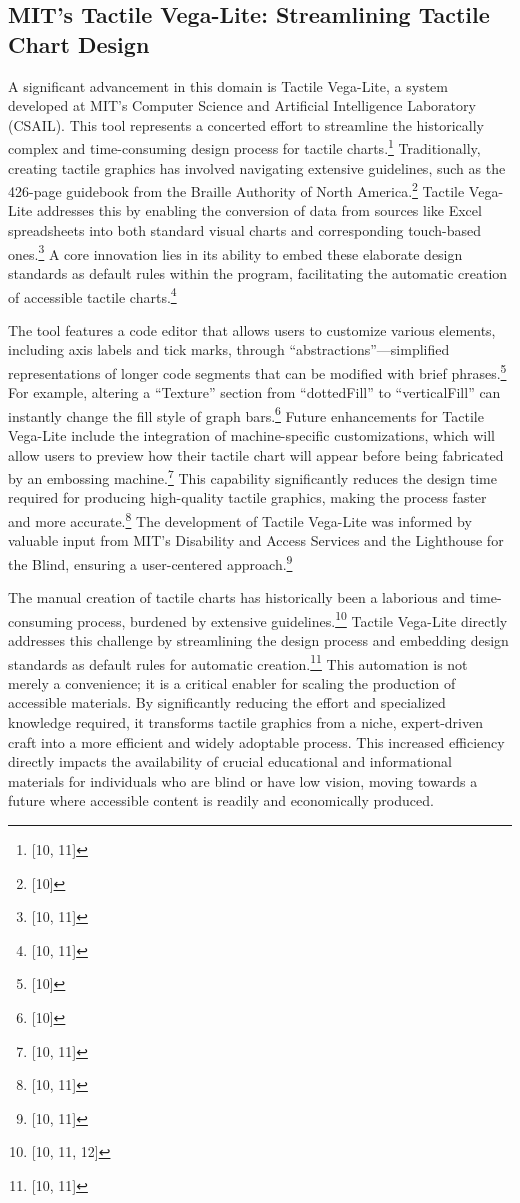 \subsection{MIT's Tactile Vega-Lite: Streamlining Tactile Chart Design}
A significant advancement in this domain is Tactile Vega-Lite, a system developed at MIT's Computer Science and Artificial Intelligence Laboratory (CSAIL). This tool represents a concerted effort to streamline the historically complex and time-consuming design process for tactile charts.\footnote{[10, 11]} Traditionally, creating tactile graphics has involved navigating extensive guidelines, such as the 426-page guidebook from the Braille Authority of North America.\footnote{[10]} Tactile Vega-Lite addresses this by enabling the conversion of data from sources like Excel spreadsheets into both standard visual charts and corresponding touch-based ones.\footnote{[10, 11]} A core innovation lies in its ability to embed these elaborate design standards as default rules within the program, facilitating the automatic creation of accessible tactile charts.\footnote{[10, 11]}

The tool features a code editor that allows users to customize various elements, including axis labels and tick marks, through ``abstractions''---simplified representations of longer code segments that can be modified with brief phrases.\footnote{[10]} For example, altering a ``Texture'' section from ``dottedFill'' to ``verticalFill'' can instantly change the fill style of graph bars.\footnote{[10]} Future enhancements for Tactile Vega-Lite include the integration of machine-specific customizations, which will allow users to preview how their tactile chart will appear before being fabricated by an embossing machine.\footnote{[10, 11]} This capability significantly reduces the design time required for producing high-quality tactile graphics, making the process faster and more accurate.\footnote{[10, 11]} The development of Tactile Vega-Lite was informed by valuable input from MIT's Disability and Access Services and the Lighthouse for the Blind, ensuring a user-centered approach.\footnote{[10, 11]}

The manual creation of tactile charts has historically been a laborious and time-consuming process, burdened by extensive guidelines.\footnote{[10, 11, 12]} Tactile Vega-Lite directly addresses this challenge by streamlining the design process and embedding design standards as default rules for automatic creation.\footnote{[10, 11]} This automation is not merely a convenience; it is a critical enabler for scaling the production of accessible materials. By significantly reducing the effort and specialized knowledge required, it transforms tactile graphics from a niche, expert-driven craft into a more efficient and widely adoptable process. This increased efficiency directly impacts the availability of crucial educational and informational materials for individuals who are blind or have low vision, moving towards a future where accessible content is readily and economically produced.

